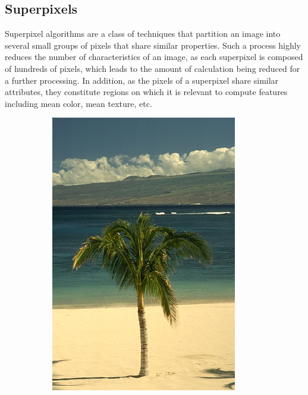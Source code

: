 \documentclass{article}
\begin{document}
    \subsection{Superpixels}
        Superpixel algorithms are a class of techniques that partition an image into several small groups of pixels that share similar properties. Such a process highly reduces the number of characteristics of an image, as each superpixel is composed of hundreds of pixels, which leads to the amount of calculation being reduced for a further processing. In addition, as the pixels of a superpixel share similar attributes, they constitute regions on which it is relevant to compute features including mean color, mean texture, etc.

        \begin{figure}[!ht]
        \centering
        \begin{subfigure}{.3\linewidth}
            \centering
            \includegraphics[width=0.9\linewidth]{pics/img_spp1.png}

\end{subfigure}
\end{figure}
\end{document}
